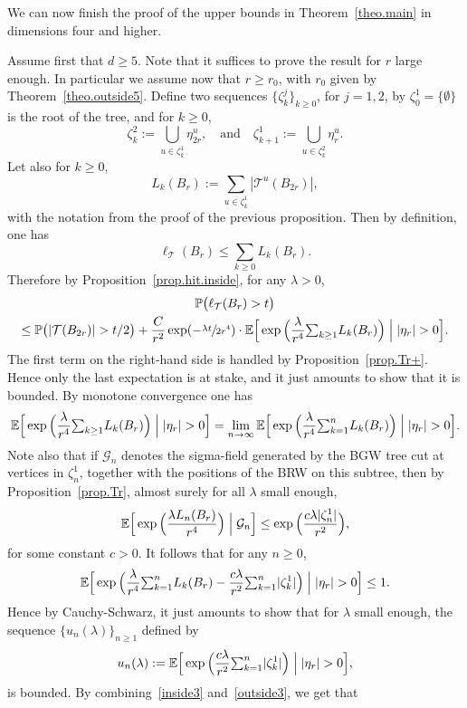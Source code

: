 \documentclass[JEP,XML,SOM,Unicode,NoFloatCountersInSection,published]{cedram}
\let\ts\textstyle
\theoremstyle{plain}
\theoremstyle{definition}
\newcommand{\1}{{\text{\Large $\mathfrak 1$}}}
\begin{document}
We can now finish the proof of the upper bounds in Theorem~\ref{theo.main}
in dimensions four and higher.

Assume first that $d\ge 5$. Note that it suffices to prove the result for $r$ large enough. In particular we assume now that $r\ge r_0$, with $r_0$ given by Theorem~\ref{theo.outside5}. Define two sequences $\{\zeta_k^j\}_{k\ge 0}$, for $j=1,2$, by $\zeta_0^1 = \{\emptyset\}$ is the root of the tree, and for $k\ge 0$,
\[
\zeta_k^2 := \bigcup_{u\in \zeta_k^1} \eta^u_{2r},
\quad \text{and}\quad \zeta_{k+1}^1 := \bigcup_{u\in \zeta_k^2} \eta^u_r.
\]
Let also for $k\ge 0$,
\[
L_k(B_r) := \sum_{u\in \zeta_k^1} |\mathcal T^u(B_{2r})|,
\]
with the notation from the proof of the previous proposition. Then by definition, one has
\[
\ell_{\mathcal T}(B_r) \le \sum_{k\ge 0} L_k(B_r).
\]
Therefore by Proposition~\ref{prop.hit.inside}, for any $\lambda>0$,
\begin{multline*}
\mathbb P\big(\ell_{\mathcal T}(B_r)>t\big)\\
\le
\mathbb P\big(|\mathcal T(B_{2r})|>t/2\big) +
\frac{C}{r^2}\exp(-\sfrac{\lambda t}{2r^4})\cdot \mathbb E\Big[\exp\Big(\frac{\lambda}{r^4}{\ts\sum_{k\ge 1}} L_k(B_r)\Big)\Bigm||\eta_r|> 0 \Big].
\end{multline*}
The first term on the right-hand side is handled by Proposition~\ref{prop.Tr+}. Hence only the last expectation is at stake, and it just
amounts to show that it is bounded. By monotone convergence one has
\[
\mathbb E\Big[\exp\Big(\frac{\lambda}{r^4}{\ts\sum_{k\ge 1}}L_k(B_r)\Big)\Bigm| |\eta_r|> 0 \Big] = \lim_{n\to \infty} \mathbb E\Big[\exp\Big(\frac{\lambda}{r^4}{\ts\sum_{k=1}^n} L_k(B_r)\Big)\Bigm||\eta_r|> 0 \Big].
\]
Note also that if $\mathcal G_n$ denotes the
sigma-field generated by the BGW tree cut at vertices in $\zeta_n^1$,
together with the positions of the BRW on this subtree, then by Proposition~\ref{prop.Tr}, almost surely for all $\lambda$ small enough,
\[
\mathbb E\Big[\exp\Big(\frac{\lambda L_n(B_r)}{r^4}\Big)\Bigm|\mathcal G_n \Big] \le \exp\Big(\frac{c\lambda |\zeta_n^1|}{r^2}\Big),
\]
for some constant $c>0$. It follows that for any $n\ge 0$,
\[
\mathbb E\Big[\exp\Big(\frac{\lambda}{r^4}{\ts\sum_{k=1}^n} L_k(B_r) - \frac{c\lambda}{r^2}{\ts\sum_{k=1}^n} |\zeta_k^1| \Big)\Bigm||\eta_r|> 0 \Big]\le 1.
\]
Hence by Cauchy-Schwarz, it just amounts to show that for $\lambda$ small enough, the sequence $\{u_n(\lambda)\}_{n\ge 1}$ defined by
\[
u_n(\lambda):=\mathbb E\Big[\exp\Big(\frac{c\lambda}{r^2}{\ts\sum_{k=1}^n} |\zeta_k^1| \Big)\Bigm||\eta_r|> 0 \Big],
\]
is bounded. By combining~\eqref{inside3} and~\eqref{outside3}, we get that
\end{document}
